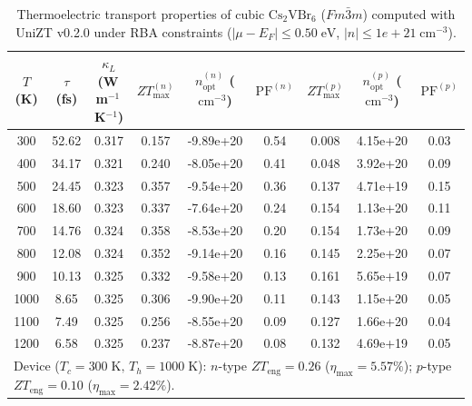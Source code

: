 \begin{table}[htbp]
\centering
\caption{Thermoelectric transport properties of cubic $\mathrm{Cs_2VBr_6}$ ($Fm\bar{3}m$) computed with UniZT v0.2.0 under RBA constraints ($|\mu - E_F| \leq 0.50\;\mathrm{eV}$, $|n| \leq 1e+21\;\mathrm{cm}^{-3}$).}
\label{tab:unizt_summary}
\begin{tabular}{ccccccccc}
\toprule
$T$ (K) & $\tau$ (fs) & $\kappa_L$ (W\,m$^{-1}$\,K$^{-1}$) & $ZT_{\max}^{(n)}$ & $n_{\mathrm{opt}}^{(n)}$ ($\mathrm{cm}^{-3}$) & $\mathrm{PF}^{(n)}$ & $ZT_{\max}^{(p)}$ & $n_{\mathrm{opt}}^{(p)}$ ($\mathrm{cm}^{-3}$) & $\mathrm{PF}^{(p)}$ \\
\midrule
300 & 52.62 & 0.317 & 0.157 & -9.89e+20 & 0.54 & 0.008 & 4.15e+20 & 0.03 \\
400 & 34.17 & 0.321 & 0.240 & -8.05e+20 & 0.41 & 0.048 & 3.92e+20 & 0.09 \\
500 & 24.45 & 0.323 & 0.357 & -9.54e+20 & 0.36 & 0.137 & 4.71e+19 & 0.15 \\
600 & 18.60 & 0.323 & 0.337 & -7.64e+20 & 0.24 & 0.154 & 1.13e+20 & 0.11 \\
700 & 14.76 & 0.324 & 0.358 & -8.53e+20 & 0.20 & 0.154 & 1.73e+20 & 0.09 \\
800 & 12.08 & 0.324 & 0.352 & -9.14e+20 & 0.16 & 0.145 & 2.25e+20 & 0.07 \\
900 & 10.13 & 0.325 & 0.332 & -9.58e+20 & 0.13 & 0.161 & 5.65e+19 & 0.07 \\
1000 & 8.65 & 0.325 & 0.306 & -9.90e+20 & 0.11 & 0.143 & 1.15e+20 & 0.05 \\
1100 & 7.49 & 0.325 & 0.256 & -8.55e+20 & 0.09 & 0.127 & 1.66e+20 & 0.04 \\
1200 & 6.58 & 0.325 & 0.237 & -8.87e+20 & 0.08 & 0.132 & 4.69e+19 & 0.05 \\
\midrule
\multicolumn{9}{l}{Device ($T_c=300\;\mathrm{K},\,T_h=1000\;\mathrm{K}$): $n$-type $ZT_{\mathrm{eng}}=0.26$ ($\eta_{\max}=5.57\%$); $p$-type $ZT_{\mathrm{eng}}=0.10$ ($\eta_{\max}=2.42\%$).} \\
\bottomrule
\end{tabular}
\end{table}
